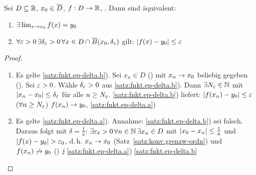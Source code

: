 \documentclass[12pt]{scrreprt}
\begin{document}
\begin{satz}\label{satz:fnkt.ep-delta}
Sei $D \subseteq \mathbb{R}$, $x_0\in\overline{D}$, $f: D \rightarrow \mathbb{R}$, . Dann sind äquivalent:
\begin{enumerate}
\item $\exists \lim_{x\rightarrow x_0} f(x) = y_0$ \label{satz:fnkt.ep-delta.a}
\item $\forall\varepsilon > 0\,\exists\delta_\varepsilon > 0\,\forall x\in D\cap \overline{B}(x_0, \delta_\varepsilon)$ gilt: $\left\lvert f(x) - y_0\right\lvert \le \varepsilon$ \label{satz:fnkt.ep-delta.b}
\end{enumerate}
\end{satz}
\begin{proof}
\begin{enumerate}
\item Es gelte \ref{satz:fnkt.ep-delta.b}). Sei $x_n\in D$ () mit $x_n \rightarrow x_0$ beliebig gegeben (\ninf). Sei $\varepsilon > 0$. Wähle $\delta_\varepsilon > 0$
aus \ref{satz:fnkt.ep-delta.b}). Dann $\exists N_\varepsilon \in\mathbb{N}$ mit $\left\lvert x_n - x_0\right\lvert \le \delta_\varepsilon$ für alle $n \ge N_\varepsilon$. \ref{satz:fnkt.ep-delta.b}) liefert:
$\left\lvert f(x_n) - y_0\right\lvert \le \varepsilon$ ($\forall n \ge N_\varepsilon$) \folgt $f(x_n) \rightarrow y_0$, \ninf{} \folgt \ref{satz:fnkt.ep-delta.a})
\item Es gelte \ref{satz:fnkt.ep-delta.a}). Annahme: \ref{satz:fnkt.ep-delta.b}) sei falsch. Daraus folgt mit $\delta = \frac{1}{n}$:
$\exists \varepsilon_\delta > 0\,\forall n\in\mathbb{N}\,\exists x_n \in D$ mit $\left\lvert x_0 - x_n\right\lvert \le \frac{1}{n}$ und $\left\lvert f(x) - y_0\right\lvert > \varepsilon_0$, 
d.\,h. $x_n \rightarrow x_0$ (Satz~\ref{satz:konv.grenzw-ordn}) und $f(x_n) \not\rightarrow y_0$ (\ninf) $\lightning$\ref{satz:fnkt.ep-delta.a}) \folgt \ref{satz:fnkt.ep-delta.b}
\end{enumerate}
\end{proof}
\end{document}
